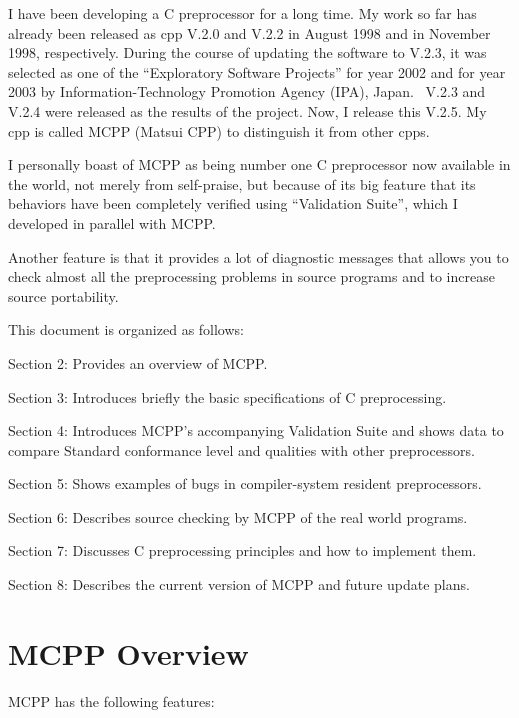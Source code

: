 \documentclass[twocolumn]{article}
\begin{document}
I have been developing a C preprocessor for a long time.  My work so far has already been released as cpp V.2.0 and V.2.2 in August 1998 and in November 1998, respectively.  During the course of updating the software to V.2.3, it was selected as one of the ``Exploratory Software Projects'' for year 2002 and for year 2003 by Information-Technology Promotion Agency (IPA), Japan.~\cite{ipa}  V.2.3 and V.2.4 were released as the results of the project.  Now, I release this V.2.5.  My cpp is called MCPP (Matsui CPP) to distinguish it from other cpps.

I personally boast of MCPP as being number one C preprocessor now available in the world, not merely from self-praise, but because of its big feature that its behaviors have been completely verified using ``Validation Suite'', which I developed in parallel with MCPP.

Another feature is that it provides a lot of diagnostic messages that allows you to check almost all the preprocessing problems in source programs and to increase source portability.

This document is organized as follows:

Section 2: Provides an overview of MCPP.

Section 3: Introduces briefly the basic specifications of C preprocessing.

Section 4: Introduces MCPP's accompanying Validation Suite and shows data to compare Standard conformance level and qualities with other preprocessors.

Section 5: Shows examples of bugs in compiler-system resident preprocessors.

Section 6: Describes source checking by MCPP of the real world programs.

Section 7: Discusses C preprocessing principles and how to implement them.

Section 8: Describes the current version of MCPP and future update plans.

\section{MCPP Overview}

MCPP has the following features:
\end{document}

